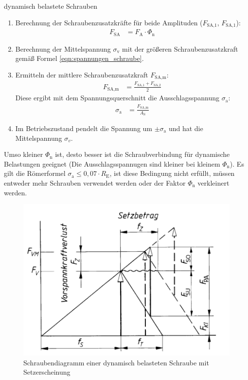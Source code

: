 \begin{eeqn}{dynamisch belastete Schrauben}
	\begin{enumerate}[itemsep=0mm,leftmargin=12pt]
	\item Berechnung der Schraubenzusatzkräfte für beide Amplituden ($F_\text{SA,1}$, $F_\text{SA,1}$):
	\begin{align}
		F_\text{SA} &= F_\text{A}\cdot \Phi_\text{n}
	\end{align}
	\item Berechnung der Mittelspannung $\sigma_\text{v}$ mit der größeren Schraubenzusatzkraft gemäß Formel \ref{eqn:spannungen_schraube}.
	\item Ermitteln der mittlere Schraubenzusatzkraft $F_\text{SA,m}$:
	\begin{align}
		F_\text{SA,m} &= \frac{F_\text{SA,1} + F_\text{SA,2}}{2}
	\end{align}
	Diese ergibt mit dem Spannungsquerschnitt die Ausschlagsspannung $\sigma_\text{a}$:
	\begin{align}
		\sigma_\text{a} &= \frac{F_\text{SA,m}}{A_\text{S}}
	\end{align}
	\item Im Betriebszustand pendelt die Spannung um $\pm \sigma_\text{a}$ und hat die Mittelspannung $\sigma_{v}$.
	\end{enumerate}
	Umso kleiner $\Phi_\text{n}$ ist, desto besser ist die Schraubverbindung für dynamische Belastungen geeignet (Die Ausschlagsspannugen sind kleiner bei kleinem $\Phi_\text{n}$).
	Es gilt die Römerformel $\sigma_\text{a} \le 0,07 \cdot R_\text{E}$, ist diese Bedingung nicht erfüllt, müssen entweder mehr Schrauben verwendet werden oder der Faktor $\Phi_\text{n}$ verkleinert werden. \\
\end{eeqn}

\begin{figure}[H]
	\centering
	\includegraphics[width=0.8\linewidth]{schrauben/schraubendiagramm}
	\caption*{Schraubendiagramm einer dynamisch belasteten Schraube mit Setzerscheinung}
\end{figure}


